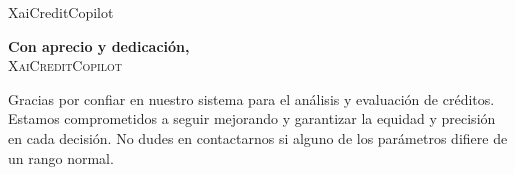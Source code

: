 \documentclass{article}
\begin{document}
XaiCreditCopilot

\begin{center}
    \textbf{Con aprecio y dedicación,}\\
    \vspace{0.5cm}
    \textsc{XaiCreditCopilot}\\
    \vspace{0.2cm}
\end{center}

{\small
Gracias por confiar en nuestro sistema para el análisis y evaluación de créditos. Estamos comprometidos a seguir mejorando y garantizar la equidad y precisión en cada decisión. No dudes en contactarnos si alguno de los parámetros difiere de un rango normal.
}
\end{document}
